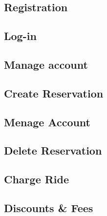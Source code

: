 \newpage
\subsection{Registration}
  

\newpage
\subsection{Log-in}
  

\newpage
\subsection{Manage account}
  

\newpage
\subsection{Create Reservation}
  
  
\newpage
\subsection{Menage Account}
  
  
\newpage
\subsection{Delete Reservation}
  

\newpage
\subsection{Charge Ride}
   

\newpage
\subsection{Discounts \& Fees}
   


